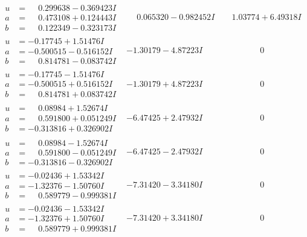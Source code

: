 \documentclass[1p]{elsarticle_modified}
\theoremstyle{definition}
\begin{document}
$$\begin{array}{c|c|c}
\begin{aligned}
u &= \phantom{-}0.299638 - 0.369423 I \\
a &= \phantom{-}0.473108 + 0.124443 I \\
b &= \phantom{-}0.122349 - 0.323173 I\end{aligned}
 & \phantom{-}0.065320 - 0.982452 I & \phantom{-}1.03774 + 6.49318 I \\ \hline\begin{aligned}
u &= -0.17745 + 1.51476 I \\
a &= -0.500515 - 0.516152 I \\
b &= \phantom{-}0.814781 - 0.083742 I\end{aligned}
 & -1.30179 - 4.87223 I & \phantom{-0.000000 } 0 \\ \hline\begin{aligned}
u &= -0.17745 - 1.51476 I \\
a &= -0.500515 + 0.516152 I \\
b &= \phantom{-}0.814781 + 0.083742 I\end{aligned}
 & -1.30179 + 4.87223 I & \phantom{-0.000000 } 0 \\ \hline\begin{aligned}
u &= \phantom{-}0.08984 + 1.52674 I \\
a &= \phantom{-}0.591800 + 0.051249 I \\
b &= -0.313816 + 0.326902 I\end{aligned}
 & -6.47425 + 2.47932 I & \phantom{-0.000000 } 0 \\ \hline\begin{aligned}
u &= \phantom{-}0.08984 - 1.52674 I \\
a &= \phantom{-}0.591800 - 0.051249 I \\
b &= -0.313816 - 0.326902 I\end{aligned}
 & -6.47425 - 2.47932 I & \phantom{-0.000000 } 0 \\ \hline\begin{aligned}
u &= -0.02436 + 1.53342 I \\
a &= -1.32376 - 1.50760 I \\
b &= \phantom{-}0.589779 - 0.999381 I\end{aligned}
 & -7.31420 - 3.34180 I & \phantom{-0.000000 } 0 \\ \hline\begin{aligned}
u &= -0.02436 - 1.53342 I \\
a &= -1.32376 + 1.50760 I \\
b &= \phantom{-}0.589779 + 0.999381 I\end{aligned}
 & -7.31420 + 3.34180 I & \phantom{-0.000000 } 0\\

\end{array}$$
\end{document}
